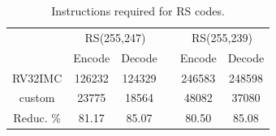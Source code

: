 \begin{table}[b]
    \begin{tabular}{ccclcc}
    \multicolumn{1}{l}{}              & \multicolumn{2}{c}{\cellcolor[HTML]{C0C0C0}RS(255,247)}         &                          & \multicolumn{2}{c}{\cellcolor[HTML]{C0C0C0}RS(255,239)}         \\
    \cellcolor[HTML]{FFFFFF}          & \cellcolor[HTML]{C0C0C0}Encode & \cellcolor[HTML]{C0C0C0}Decode & \cellcolor[HTML]{FFFFFF} & \cellcolor[HTML]{C0C0C0}Encode & \cellcolor[HTML]{C0C0C0}Decode \\ \hline
    \cellcolor[HTML]{EFEFEF}RV32IMC   & 126232                         & 124329                         &                          & 246583                         & 248598                         \\
    \cellcolor[HTML]{EFEFEF}custom    & 23775                          & 18564                          &                          & 48082                          & 37080                          \\
    \cellcolor[HTML]{EFEFEF}Reduc. \% & 81.17                          & 85.07                          &                          & 80.50                          & 85.08                         
    \end{tabular}
    \caption{Instructions required for RS codes.}
    \label{tab:rs}
\end{table}
